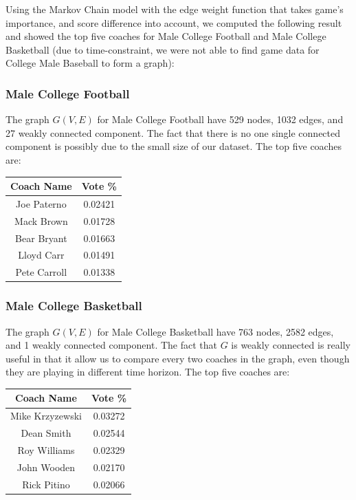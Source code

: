 \documentclass[titlepage,12pt]{article}
\begin{document}
Using the Markov Chain model with the edge weight function that takes game's importance, and score difference into account, we computed the following result and showed the top five coaches for Male College Football and Male College Basketball (due to time-constraint, we were not able to find game data for College Male Baseball to form a graph):

\subsubsection*{Male College Football}

\noindent The graph $G(V, E)$ for Male College Football have 529 nodes, 1032 edges, and 27 weakly connected component. The fact that there is no one single connected component is possibly due to the small size of our dataset. The top five coaches are:

\begin{center}
\begin{tabular}{ | c | c | }
\hline
Coach Name   & Vote \% \\\hline
Joe Paterno  & 0.02421 \\\hline
Mack Brown   & 0.01728 \\\hline
Bear Bryant  & 0.01663 \\\hline
Lloyd Carr   & 0.01491 \\\hline
Pete Carroll & 0.01338 \\
\hline
\end{tabular}
\end{center}

\subsubsection*{Male College Basketball}

\noindent The graph $G(V, E)$ for Male College Basketball have 763 nodes, 2582 edges, and 1 weakly connected component. The fact that $G$ is weakly connected is really useful in that it allow us to compare every two coaches in the graph, even though they are playing in different time horizon. The top five coaches are:

\begin{center}
\begin{tabular}{ | c | c | }
\hline
Coach Name  & Vote \% \\\hline
Mike Krzyzewski & 0.03272 \\\hline
Dean Smith  & 0.02544 \\\hline
Roy Williams & 0.02329 \\\hline
John Wooden  & 0.02170 \\\hline
Rick Pitino  & 0.02066 \\
\hline
\end{tabular}
\end{center}
\end{document}
